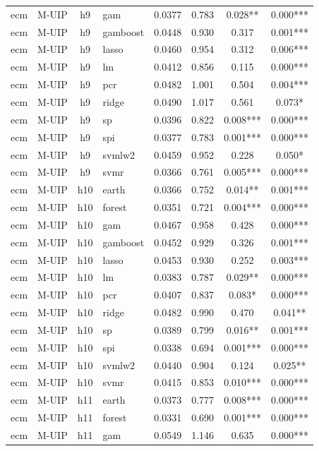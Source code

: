 \begin{ThreePartTable}
\begin{longtable}[t]{llclcccc}
ecm & M-UIP & h9 & gam & 0.0377 & 0.783 & 0.028** & 0.000***\\
ecm & M-UIP & h9 & gamboost & 0.0448 & 0.930 & 0.317 & 0.001***\\
ecm & M-UIP & h9 & lasso & 0.0460 & 0.954 & 0.312 & 0.006***\\
ecm & M-UIP & h9 & lm & 0.0412 & 0.856 & 0.115 & 0.000***\\
ecm & M-UIP & h9 & pcr & 0.0482 & 1.001 & 0.504 & 0.004***\\
ecm & M-UIP & h9 & ridge & 0.0490 & 1.017 & 0.561 & 0.073*\\
ecm & M-UIP & h9 & sp & 0.0396 & 0.822 & 0.008*** & 0.000***\\
ecm & M-UIP & h9 & spi & 0.0377 & 0.783 & 0.001*** & 0.000***\\
ecm & M-UIP & h9 & svmlw2 & 0.0459 & 0.952 & 0.228 & 0.050*\\
ecm & M-UIP & h9 & svmr & 0.0366 & 0.761 & 0.005*** & 0.000***\\
\addlinespace
ecm & M-UIP & h10 & earth & 0.0366 & 0.752 & 0.014** & 0.001***\\
ecm & M-UIP & h10 & forest & 0.0351 & 0.721 & 0.004*** & 0.000***\\
ecm & M-UIP & h10 & gam & 0.0467 & 0.958 & 0.428 & 0.000***\\
ecm & M-UIP & h10 & gamboost & 0.0452 & 0.929 & 0.326 & 0.001***\\
ecm & M-UIP & h10 & lasso & 0.0453 & 0.930 & 0.252 & 0.003***\\
ecm & M-UIP & h10 & lm & 0.0383 & 0.787 & 0.029** & 0.000***\\
ecm & M-UIP & h10 & pcr & 0.0407 & 0.837 & 0.083* & 0.000***\\
ecm & M-UIP & h10 & ridge & 0.0482 & 0.990 & 0.470 & 0.041**\\
ecm & M-UIP & h10 & sp & 0.0389 & 0.799 & 0.016** & 0.001***\\
ecm & M-UIP & h10 & spi & 0.0338 & 0.694 & 0.001*** & 0.000***\\
ecm & M-UIP & h10 & svmlw2 & 0.0440 & 0.904 & 0.124 & 0.025**\\
ecm & M-UIP & h10 & svmr & 0.0415 & 0.853 & 0.010*** & 0.000***\\
\addlinespace
ecm & M-UIP & h11 & earth & 0.0373 & 0.777 & 0.008*** & 0.000***\\
ecm & M-UIP & h11 & forest & 0.0331 & 0.690 & 0.001*** & 0.000***\\
ecm & M-UIP & h11 & gam & 0.0549 & 1.146 & 0.635 & 0.000***\\

\end{longtable}
\end{ThreePartTable}
